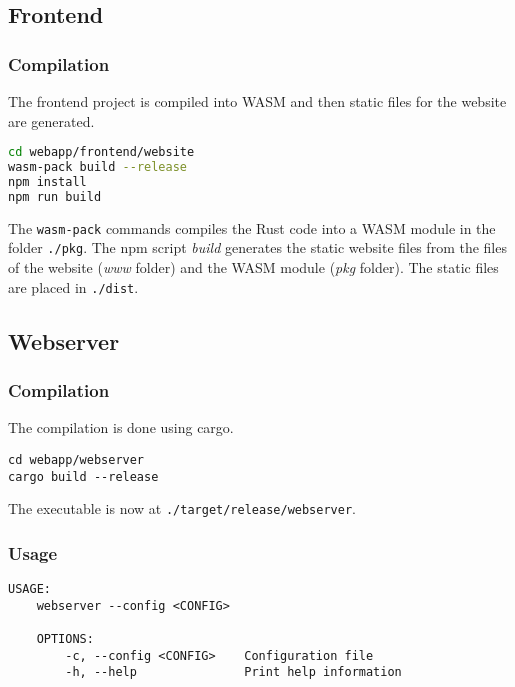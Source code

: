 \documentclass[../documentation.tex]{subfiles}
\begin{document}
\subsection{Frontend}

\subsubsection{Compilation}

The frontend project is compiled into WASM and then
static files for the website are generated.

\begin{lstlisting}[language=bash]
cd webapp/frontend/website
wasm-pack build --release
npm install
npm run build
\end{lstlisting}

The \texttt{wasm-pack} commands compiles the Rust code into
a WASM module in the folder \texttt{./pkg}.
The npm script \textit{build} generates the static website files
from the files of the website (\textit{www} folder)
and the WASM module (\textit{pkg} folder).
The static files are placed in \texttt{./dist}.

\subsection{Webserver}

\subsubsection{Compilation}

The compilation is done using cargo.

\begin{lstlisting}[style=boxed, numbers=none]
cd webapp/webserver
cargo build --release
\end{lstlisting}

The executable is now at \texttt{./target/release/webserver}.

\subsubsection{Usage}

\begin{lstlisting}[style=boxed, numbers=none]
    USAGE:
    webserver --config <CONFIG>

    OPTIONS:
        -c, --config <CONFIG>    Configuration file
        -h, --help               Print help information
\end{lstlisting}
\end{document}

